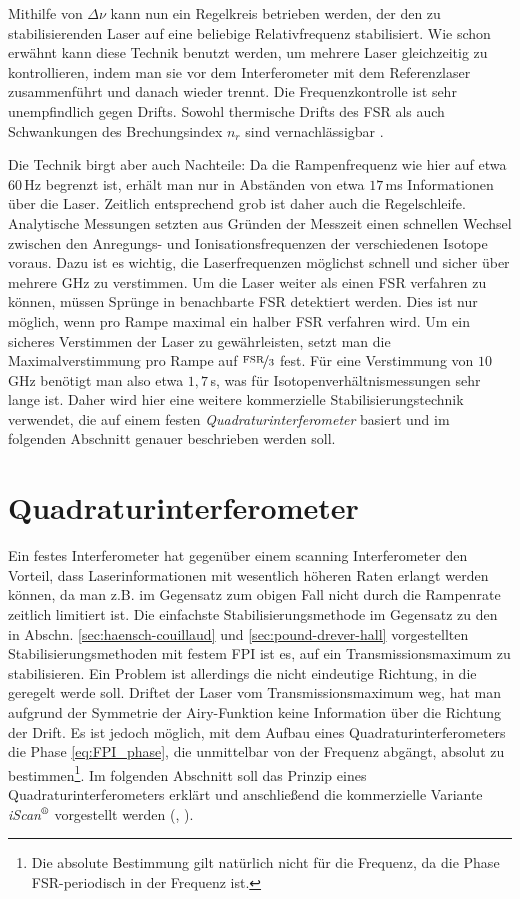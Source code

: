 Mithilfe von $\Delta\nu$ kann nun ein Regelkreis betrieben werden, der den zu
stabilisierenden Laser auf eine beliebige Relativfrequenz stabilisiert. Wie
schon erwähnt kann diese Technik benutzt werden, um mehrere Laser
gleichzeitig zu kontrollieren, indem man sie vor dem Interferometer mit dem
Referenzlaser zusammenführt und danach wieder trennt. Die Frequenzkontrolle
ist sehr unempfindlich gegen Drifts. Sowohl thermische Drifts des FSR als auch
Schwankungen des Brechungsindex $n_r$ sind vernachlässigbar
\cite{kuschnick:2000:diplomarbeit}.\par
Die Technik birgt aber auch Nachteile: Da die Rampenfrequenz wie hier auf etwa
$60\,$Hz begrenzt ist, erhält man nur in Abständen von etwa $17\,$ms
Informationen über die Laser. Zeitlich entsprechend grob ist daher auch die
Regelschleife. Analytische Messungen setzten aus Gründen der Messzeit einen
schnellen Wechsel zwischen den Anregungs- und Ionisationsfrequenzen der verschiedenen
Isotope voraus. Dazu ist es wichtig, die Laserfrequenzen möglichst schnell
und sicher über mehrere GHz zu verstimmen. Um die Laser weiter als einen FSR
verfahren zu können, müssen Sprünge in benachbarte FSR detektiert werden. Dies ist nur möglich, wenn pro Rampe maximal ein halber FSR verfahren wird. Um ein sicheres
Verstimmen der Laser zu gewährleisten, setzt man die Maximalverstimmung pro
Rampe auf $\nicefrac{\text{FSR}}{3}$ fest. Für eine Verstimmung von $10\,$GHz benötigt
man also etwa $1,7\,$s, was für Isotopenverhältnismessungen sehr lange ist.
Daher wird hier eine weitere kommerzielle Stabilisierungstechnik verwendet, die auf einem festen
\textit{Quadraturinterferometer} basiert und im folgenden Abschnitt genauer
beschrieben werden soll.

\section{Quadraturinterferometer}\label{sec:quadraturinterferometer}
Ein festes Interferometer hat gegenüber einem scanning Interferometer den
Vorteil, dass Laserinformationen mit wesentlich höheren Raten erlangt werden
können, da man z.B. im Gegensatz zum obigen Fall nicht durch die Rampenrate
zeitlich limitiert ist. Die einfachste Stabilisierungsmethode im Gegensatz zu
den in Abschn. \ref{sec:haensch-couillaud} und \ref{sec:pound-drever-hall}
vorgestellten Stabilisierungsmethoden mit festem FPI ist es, auf ein Transmissionsmaximum zu
stabilisieren. Ein Problem ist allerdings die nicht eindeutige Richtung, in die
geregelt werde soll. Driftet der Laser vom Transmissionsmaximum weg, hat man
aufgrund der Symmetrie der Airy-Funktion keine Information über die Richtung
der Drift. Es ist jedoch möglich, mit dem Aufbau eines
Quadraturinterferometers die Phase \eqref{eq:FPI_phase}, die unmittelbar von der Frequenz abgängt, absolut zu
bestimmen\footnote{Die absolute Bestimmung gilt natürlich nicht für die
Frequenz, da die Phase FSR-periodisch in der Frequenz ist.}. Im folgenden
Abschnitt soll das Prinzip eines Quadraturinterferometers erklärt und
anschließend die kommerzielle Variante
\textit{iScan$^\text{\textregistered}$} vorgestellt werden
(\cite{kinder:2003:dissertation}, \cite{iscan_hardware_guide}).

